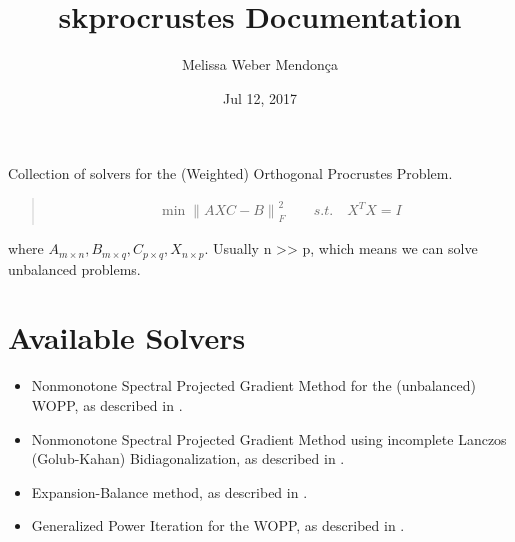 \documentclass[a4paper,10pt,english]{sphinxmanual}
\title{skprocrustes Documentation}
\date{Jul 12, 2017}
\author{Melissa Weber Mendonça}
\begin{document}
\maketitle
\sphinxtableofcontents
{}\label{\detokenize{index::doc}}


Collection of solvers for the (Weighted) Orthogonal Procrustes Problem.
\begin{quote}
\begin{equation*}
\begin{split}\min  {\| AXC-B \|}_F^2 \qquad s. t. \quad X^TX=I\end{split}
\end{equation*}\end{quote}

where \(A_{m \times n}, B_{m \times q}, C_{p \times q},
X_{n \times p}\). Usually n \textgreater{}\textgreater{} p, which means we can solve unbalanced problems.


\chapter{Available Solvers}
\label{\detokenize{index:available-solvers}}\label{\detokenize{index:scikit-procrustes}}\begin{itemize}
\item {} 
    Nonmonotone Spectral Projected Gradient Method for the (unbalanced) WOPP, as described in \label{\detokenize{index:id1}}{\hyperref[\detokenize{index:franbaza12}]{\sphinxcrossref{{[}FB12{]}}}}.

\item {} 
    Nonmonotone Spectral Projected Gradient Method using incomplete Lanczos (Golub-Kahan) Bidiagonalization, as described in \label{\detokenize{index:id2}}{\hyperref[\detokenize{index:franbazawebe17}]{\sphinxcrossref{{[}FBM17{]}}}}.

\item {} 
      Expansion-Balance method, as described in \label{\detokenize{index:id3}}{\hyperref[\detokenize{index:bergknol84}]{\sphinxcrossref{{[}tBK84{]}}}}.

\item {} 
    Generalized Power Iteration for the WOPP, as described in \label{\detokenize{index:id4}}{\hyperref[\detokenize{index:niezhanli17}]{\sphinxcrossref{{[}NZL17{]}}}}.

\end{itemize}
\end{document}
